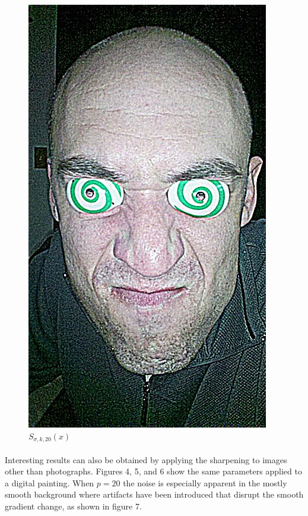 \documentclass[10pt,twocolumn]{article}
\begin{document}
\begin{figure}
\begin{minipage}{0.15\textwidth}
\centering \includegraphics[width=\textwidth]{sharpface.jpg}
\caption{ $S_{\sigma, k, 20}(x)$ }
\end{minipage}
\end{figure}

	\paragraph{} Interesting results can also be obtained by applying the sharpening to images other than photographs.  Figures 4, 5, and 6 show the same parameters applied to a digital painting.  When $p=20$ the noise is especially apparent in the mostly smooth background where artifacts have been introduced that disrupt the smooth gradient change, as shown in figure 7.
\end{document}
